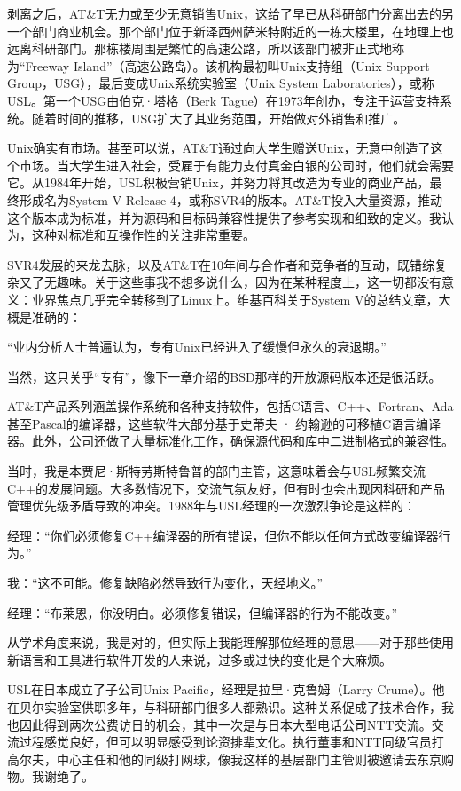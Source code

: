 \documentclass[a4paper,12pt,UTF8,twoside]{ctexbook}
\begin{document}
剥离之后，AT\&T无力或至少无意销售Unix，这给了早已从科研部门分离出去的另一个部门商业机会。那个部门位于新泽西州萨米特附近的一栋大楼里，在地理上也远离科研部门。那栋楼周围是繁忙的高速公路，所以该部门被非正式地称为“Freeway Island”（高速公路岛）。该机构最初叫Unix支持组（Unix Support Group，USG），最后变成Unix系统实验室（Unix System Laboratories），或称USL。第一个USG由伯克·塔格（Berk Tague）在1973年创办，专注于运营支持系统。随着时间的推移，USG扩大了其业务范围，开始做对外销售和推广。

Unix确实有市场。甚至可以说，AT\&T通过向大学生赠送Unix，无意中创造了这个市场。当大学生进入社会，受雇于有能力支付真金白银的公司时，他们就会需要它。从1984年开始，USL积极营销Unix，并努力将其改造为专业的商业产品，最终形成名为System V Release 4，或称SVR4的版本。AT\&T投入大量资源，推动这个版本成为标准，并为源码和目标码兼容性提供了参考实现和细致的定义。我认为，这种对标准和互操作性的关注非常重要。

SVR4发展的来龙去脉，以及AT\&T在10年间与合作者和竞争者的互动，既错综复杂又了无趣味。关于这些事我不想多说什么，因为在某种程度上，这一切都没有意义：业界焦点几乎完全转移到了Linux上。维基百科关于System V的总结文章，大概是准确的：

“业内分析人士普遍认为，专有Unix已经进入了缓慢但永久的衰退期。”

当然，这只关乎“专有”，像下一章介绍的BSD那样的开放源码版本还是很活跃。

AT\&T产品系列涵盖操作系统和各种支持软件，包括C语言、C++、Fortran、Ada甚至Pascal的编译器，这些软件大部分基于史蒂夫 · 约翰逊的可移植C语言编译器。此外，公司还做了大量标准化工作，确保源代码和库中二进制格式的兼容性。

当时，我是本贾尼·斯特劳斯特鲁普的部门主管，这意味着会与USL频繁交流C++的发展问题。大多数情况下，交流气氛友好，但有时也会出现因科研和产品管理优先级矛盾导致的冲突。1988年与USL经理的一次激烈争论是这样的：

经理：“你们必须修复C++编译器的所有错误，但你不能以任何方式改变编译器行为。”

我：“这不可能。修复缺陷必然导致行为变化，天经地义。”

经理：“布莱恩，你没明白。必须修复错误，但编译器的行为不能改变。”

从学术角度来说，我是对的，但实际上我能理解那位经理的意思——对于那些使用新语言和工具进行软件开发的人来说，过多或过快的变化是个大麻烦。

USL在日本成立了子公司Unix Pacific，经理是拉里·克鲁姆（Larry Crume）。他在贝尔实验室供职多年，与科研部门很多人都熟识。这种关系促成了技术合作，我也因此得到两次公费访日的机会，其中一次是与日本大型电话公司NTT交流。交流过程感觉良好，但可以明显感受到论资排辈文化。执行董事和NTT同级官员打高尔夫，中心主任和他的同级打网球，像我这样的基层部门主管则被邀请去东京购物。我谢绝了。
\end{document}
